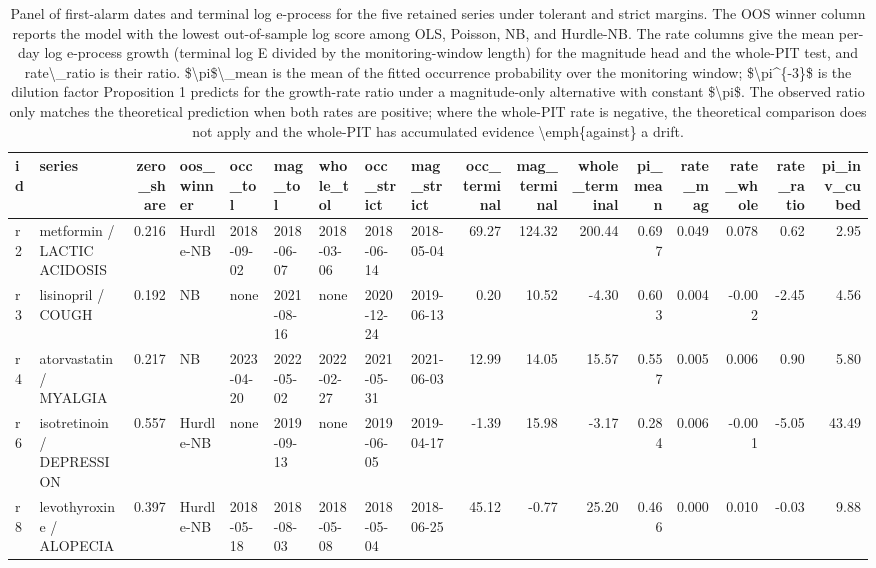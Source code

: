 \begin{table}

\caption{Panel of first-alarm dates and terminal log e-process for the five retained series under tolerant and strict margins. The OOS winner column reports the model with the lowest out-of-sample log score among OLS, Poisson, NB, and Hurdle-NB. The rate columns give the mean per-day log e-process growth (terminal log E divided by the monitoring-window length) for the magnitude head and the whole-PIT test, and rate\textbackslash{}\_ratio is their ratio. \$\textbackslash{}pi\$\textbackslash{}\_mean is the mean of the fitted occurrence probability over the monitoring window; \$\textbackslash{}pi\textasciicircum{}\{-3\}\$ is the dilution factor Proposition 1 predicts for the growth-rate ratio under a magnitude-only alternative with constant \$\textbackslash{}pi\$. The observed ratio only matches the theoretical prediction when both rates are positive; where the whole-PIT rate is negative, the theoretical comparison does not apply and the whole-PIT has accumulated evidence \textbackslash{}emph\{against\} a drift.}
\centering
\begin{tabular}[t]{llrllllllrrrrrrrr}
\toprule
id & series & zero\_share & oos\_winner & occ\_tol & mag\_tol & whole\_tol & occ\_strict & mag\_strict & occ\_terminal & mag\_terminal & whole\_terminal & pi\_mean & rate\_mag & rate\_whole & rate\_ratio & pi\_inv\_cubed\\
\midrule
r2 & metformin / LACTIC ACIDOSIS & 0.216 & Hurdle-NB & 2018-09-02 & 2018-06-07 & 2018-03-06 & 2018-06-14 & 2018-05-04 & 69.27 & 124.32 & 200.44 & 0.697 & 0.049 & 0.078 & 0.62 & 2.95\\
r3 & lisinopril / COUGH & 0.192 & NB & none & 2021-08-16 & none & 2020-12-24 & 2019-06-13 & 0.20 & 10.52 & -4.30 & 0.603 & 0.004 & -0.002 & -2.45 & 4.56\\
r4 & atorvastatin / MYALGIA & 0.217 & NB & 2023-04-20 & 2022-05-02 & 2022-02-27 & 2021-05-31 & 2021-06-03 & 12.99 & 14.05 & 15.57 & 0.557 & 0.005 & 0.006 & 0.90 & 5.80\\
r6 & isotretinoin / DEPRESSION & 0.557 & Hurdle-NB & none & 2019-09-13 & none & 2019-06-05 & 2019-04-17 & -1.39 & 15.98 & -3.17 & 0.284 & 0.006 & -0.001 & -5.05 & 43.49\\
r8 & levothyroxine / ALOPECIA & 0.397 & Hurdle-NB & 2018-05-18 & 2018-08-03 & 2018-05-08 & 2018-05-04 & 2018-06-25 & 45.12 & -0.77 & 25.20 & 0.466 & 0.000 & 0.010 & -0.03 & 9.88\\
\bottomrule
\end{tabular}
\end{table}
